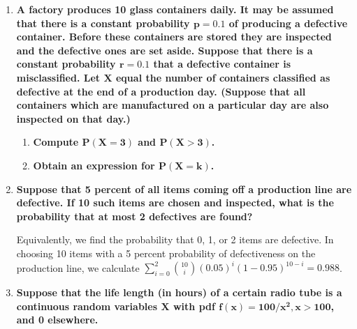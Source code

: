 \documentclass[10pt, oneside]{article}   	%
\theoremstyle{definition}
\begin{document}
\begin{enumerate}[label=4.\arabic*]
\item  \begin{tcolorbox}[
  colback=Cerulean!5!white,
  colframe=Cerulean!75!black]
\textbf{A factory produces 10 glass containers daily. It may be assumed that there is a constant probability $\bm{p = 0.1}$ of producing a defective container. Before these containers are stored they are inspected and the defective ones are set aside. Suppose that there is a constant probability $\bm{r = 0.1}$ that a defective container is misclassified. Let $\bm{X}$ equal the number of containers classified as defective at the end of a production day. (Suppose that all containers which are manufactured on a particular day are also inspected on that day.)}
\end{tcolorbox}

	\begin{enumerate}
	\item  \begin{tcolorbox}[
	  colback=Cerulean!5!white,
	  colframe=Cerulean!75!black]
	\textbf{Compute $\bm{P(X = 3)}$ and $\bm{P(X > 3)}$.}
	\end{tcolorbox}
	
	\item  \begin{tcolorbox}[
	  colback=Cerulean!5!white,
	  colframe=Cerulean!75!black]
	\textbf{Obtain an expression for $\bm{P(X = k)}$.}
	\end{tcolorbox}
	\end{enumerate}

\item  \begin{tcolorbox}[
  colback=Cerulean!5!white,
  colframe=Cerulean!75!black]
\textbf{Suppose that 5 percent of all items coming off a production line are defective. If 10 such items are chosen and inspected, what is the probability that at most 2 defectives are found?}
\end{tcolorbox}

Equivalently, we find the probability that 0, 1, or 2 items are defective. In choosing 10 items with a 5 percent probability of defectiveness on the production line, we calculate $\sum^2_{i=0} \binom{10}{i} (0.05)^i (1-0.95)^{10-i} = \boxed{0.988}$.

\item  \begin{tcolorbox}[
  colback=Cerulean!5!white,
  colframe=Cerulean!75!black]
\textbf{Suppose that the life length (in hours) of a certain radio tube is a continuous random variables $\bm{X}$ with pdf $\bm{f(x) = 100/x^2, x > 100}$, and 0 elsewhere.}
\end{tcolorbox}


\end{enumerate}
\end{document}
